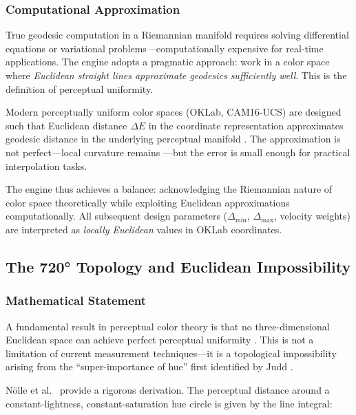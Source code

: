 \subsubsection{Computational Approximation}

True geodesic computation in a Riemannian manifold requires solving differential equations or variational problems—computationally expensive for real-time applications. The engine adopts a pragmatic approach: work in a color space where \emph{Euclidean straight lines approximate geodesics sufficiently well}. This is the definition of perceptual uniformity.

Modern perceptually uniform color spaces (OKLab, CAM16-UCS) are designed such that Euclidean distance $\Delta E$ in the coordinate representation approximates geodesic distance in the underlying perceptual manifold \citep{ottosson2020,safdar2017}. The approximation is not perfect—local curvature remains \citep{hong2024}—but the error is small enough for practical interpolation tasks.

The engine thus achieves a balance: acknowledging the Riemannian nature of color space theoretically while exploiting Euclidean approximations computationally. All subsequent design parameters ($\Delta_{\min}$, $\Delta_{\max}$, velocity weights) are interpreted as \emph{locally Euclidean} values in OKLab coordinates.

\subsection{The 720° Topology and Euclidean Impossibility}
\label{sec:topology-impossibility}

\subsubsection{Mathematical Statement}

A fundamental result in perceptual color theory is that no three-dimensional Euclidean space can achieve perfect perceptual uniformity \citep{nolle2012}. This is not a limitation of current measurement techniques—it is a topological impossibility arising from the ``super-importance of hue'' first identified by Judd \citep{judd1940}.

Nölle et al.\ \citeyearpar{nolle2012} provide a rigorous derivation. The perceptual distance around a constant-lightness, constant-saturation hue circle is given by the line integral:

